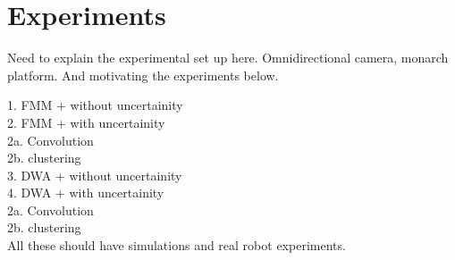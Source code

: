 \section{Experiments}
Need to explain the experimental set up here. Omnidirectional camera, monarch platform. And motivating the experiments below. 


1. FMM + without uncertainity\\
2. FMM + with uncertainity\\
	2a. Convolution\\
	2b. clustering\\

3. DWA + without uncertainity\\
4. DWA + with uncertainity\\
	2a. Convolution\\
	2b. clustering\\

All these should have simulations and real robot experiments.\\


\label{sec:results}




